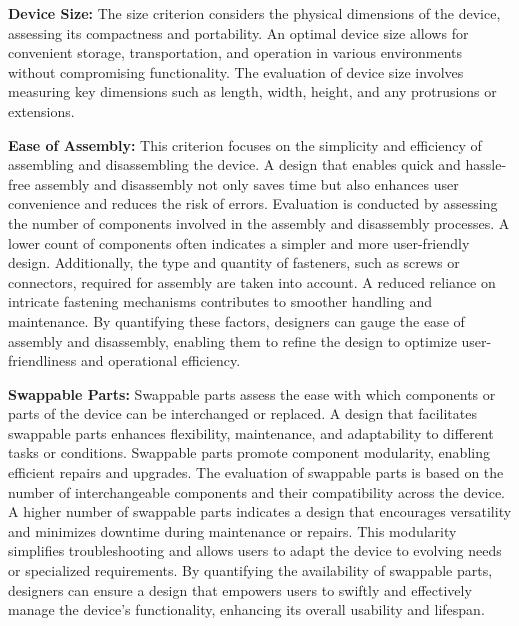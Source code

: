 \textbf{Device Size:} The size criterion considers the physical dimensions of the device, assessing its compactness and portability. An optimal device size allows for convenient storage, transportation, and operation in various environments without compromising functionality. The evaluation of device size involves measuring key dimensions such as length, width, height, and any protrusions or extensions.

\textbf{Ease of Assembly:} This criterion focuses on the simplicity and efficiency of assembling and disassembling the device. A design that enables quick and hassle-free assembly and disassembly not only saves time but also enhances user convenience and reduces the risk of errors. Evaluation is conducted by assessing the number of components involved in the assembly and disassembly processes. A lower count of components often indicates a simpler and more user-friendly design. Additionally, the type and quantity of fasteners, such as screws or connectors, required for assembly are taken into account. A reduced reliance on intricate fastening mechanisms contributes to smoother handling and maintenance. By quantifying these factors, designers can gauge the ease of assembly and disassembly, enabling them to refine the design to optimize user-friendliness and operational efficiency.

\textbf{Swappable Parts:} Swappable parts assess the ease with which components or parts of the device can be interchanged or replaced. A design that facilitates swappable parts enhances flexibility, maintenance, and adaptability to different tasks or conditions. Swappable parts promote component modularity, enabling efficient repairs and upgrades. The evaluation of swappable parts is based on the number of interchangeable components and their compatibility across the device. A higher number of swappable parts indicates a design that encourages versatility and minimizes downtime during maintenance or repairs. This modularity simplifies troubleshooting and allows users to adapt the device to evolving needs or specialized requirements. By quantifying the availability of swappable parts, designers can ensure a design that empowers users to swiftly and effectively manage the device's functionality, enhancing its overall usability and lifespan.

